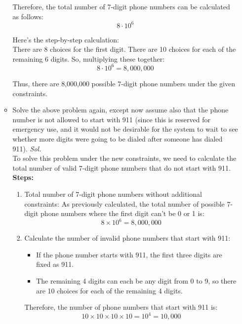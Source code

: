 \documentclass{book}
\begin{document}
\begin{enumerate}
\begin{itemize}
		            Therefore, the total number of 7-digit phone numbers can be calculated as follows:\\
		            \[
			            8 \cdot 10^6
		            \]

		            Here's the step-by-step calculation:\\
		            There are 8 choices for the first digit.
		            There are 10 choices for each of the remaining 6 digits.
		            So, multiplying these together:
		            \[
			            8\cdot10^6=8,000,000
		            \]

		            Thus, there are 8,000,000 possible 7-digit phone numbers under the given constraints.
		      \item  Solve the above problem again, except now assume also that
		            the phone number is not allowed to start with 911 (since
		            this is reserved for emergency use, and it would not be
		            desirable for the system to wait to see whether more digits
		            were going to be dialed after someone has dialed 911).
		            \textit{ Sol. }\\
		            To solve this problem under the new constraints, we need to calculate the total number of valid 7-digit phone numbers that do not start with 911.\\
		            \textbf{Steps:}
		            \begin{enumerate}
			            \item Total number of 7-digit phone numbers without additional constraints:
			                  As previously calculated, the total number of possible 7-digit phone numbers where the first digit can't be 0 or 1 is:
			                  \[
				                  8×10^6
				                  =8,000,000
			                  \]
			            \item Calculate the number of invalid phone numbers that start with 911:
			                  \begin{itemize}
				                  \item If the phone number starts with 911, the first three digits are fixed as 911.
				                  \item The remaining 4 digits can each be any digit from 0 to 9, so there are
				                        10 choices for each of the remaining 4 digits.
			                  \end{itemize}
			                  Therefore, the number of phone numbers that start with 911 is:
			                  \[
				                  10
				                  ×
				                  10
				                  ×
				                  10
				                  ×
				                  10
				                  =
				                  1
				                  0
				                  ^4
				                  =
				                  10
				                  ,
				                  000
			                  \]


\end{enumerate}
\end{itemize}
\end{enumerate}
\end{document}
